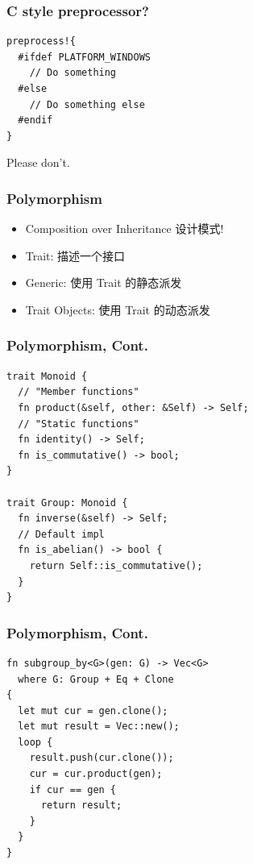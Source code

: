 \documentclass[UTF-8]{ctexbeamer}
\begin{document}
\begin{frame}[fragile]
  \frametitle{C style preprocessor?}

  \pause

  \begin{verbatim}
preprocess!{
  #ifdef PLATFORM_WINDOWS
    // Do something
  #else
    // Do something else
  #endif
}
  \end{verbatim}

  \pause
  \vspace{1em}

  Please don't.
  
\end{frame}

\begin{frame}
  \frametitle{Polymorphism}

  \begin{itemize}
    \item Composition over Inheritance {\tiny{设计模式!}}
    \item Trait: 描述一个接口
    \pause
    \item Generic: 使用 Trait 的静态派发
    \item Trait Objects: 使用 Trait 的动态派发
  \end{itemize}
\end{frame}

\begin{frame}[fragile]
  \frametitle{Polymorphism, Cont.}
  \begin{verbatim}
trait Monoid {
  // "Member functions"
  fn product(&self, other: &Self) -> Self;
  // "Static functions"
  fn identity() -> Self;
  fn is_commutative() -> bool;
}

trait Group: Monoid {
  fn inverse(&self) -> Self;
  // Default impl
  fn is_abelian() -> bool {
    return Self::is_commutative();
  }
}
  \end{verbatim}
\end{frame}

\begin{frame}[fragile]
  \frametitle{Polymorphism, Cont.}

  \begin{verbatim}
fn subgroup_by<G>(gen: G) -> Vec<G>
  where G: Group + Eq + Clone
{
  let mut cur = gen.clone();
  let mut result = Vec::new();
  loop {
    result.push(cur.clone());
    cur = cur.product(gen);
    if cur == gen {
      return result;
    }
  }
}
  \end{verbatim}
\end{frame}
\end{document}
